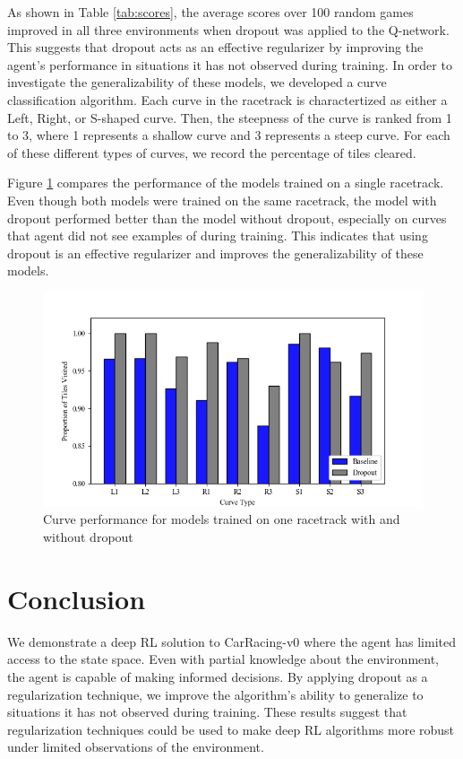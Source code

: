 \documentclass{article}
\begin{document}
As shown in Table \ref{tab:scores}, the average scores over 100 random games improved in all three environments when dropout was applied to the Q-network. This suggests that dropout acts as an effective regularizer by improving the agent's performance in situations it has not observed during training. In order to investigate the generalizability of these models, we developed a curve classification algorithm. Each curve in the racetrack is charactertized as either a Left, Right, or S-shaped curve. Then, the steepness of the curve is ranked from 1 to 3, where 1 represents a shallow curve and 3 represents a steep curve. For each of these different types of curves, we record the percentage of tiles cleared.  

Figure \ref{fig:curves_comparison} compares the performance of the models trained on a single racetrack. Even though both models were trained on the same racetrack, the model with dropout performed better than the model without dropout, especially on curves that agent did not see examples of during training. 
This indicates that using dropout is an effective regularizer and improves the generalizability of these models.

\begin{figure}[!h]
\centering
\includegraphics[scale=0.7]{Graphics/curve_plot.png}
\caption{Curve performance for models trained on one racetrack with and without dropout}
\label{fig:curves_comparison}
\end{figure}

\section{Conclusion}
We demonstrate a deep RL solution to CarRacing-v0 where the agent has limited access to the state space. Even with partial knowledge about the environment, the agent is capable of making informed decisions. By applying dropout as a regularization technique, we improve the algorithm's ability to generalize to situations it has not observed during training. These results suggest that regularization techniques could be used to make deep RL algorithms more robust under limited observations of the environment.
\end{document}
